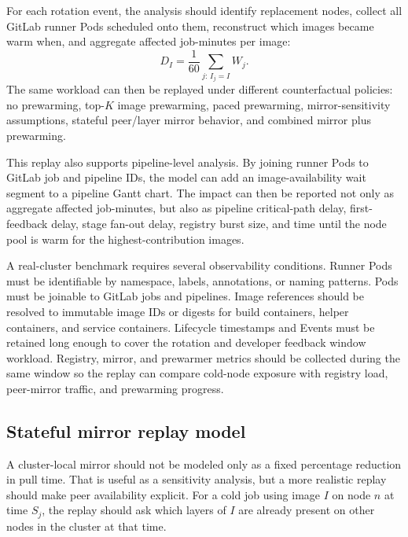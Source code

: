 \documentclass[11pt,a4paper]{article}
\begin{document}
For each rotation event, the analysis should identify replacement nodes, collect all GitLab runner Pods scheduled onto them, reconstruct which images became warm when, and aggregate affected job-minutes per image:
\begin{equation}
  D_I = \frac{1}{60}\sum_{j:\,I_j=I} W_j.
\end{equation}
The same workload can then be replayed under different counterfactual policies: no prewarming, top-\(K\) image prewarming, paced prewarming, mirror-sensitivity assumptions, stateful peer/layer mirror behavior, and combined mirror plus prewarming.

This replay also supports pipeline-level analysis. By joining runner Pods to GitLab job and pipeline IDs, the model can add an image-availability wait segment to a pipeline Gantt chart. The impact can then be reported not only as aggregate affected job-minutes, but also as pipeline critical-path delay, first-feedback delay, stage fan-out delay, registry burst size, and time until the node pool is warm for the highest-contribution images.

A real-cluster benchmark requires several observability conditions. Runner Pods must be identifiable by namespace, labels, annotations, or naming patterns. Pods must be joinable to GitLab jobs and pipelines. Image references should be resolved to immutable image IDs or digests for build containers, helper containers, and service containers. Lifecycle timestamps and Events must be retained long enough to cover the rotation and developer feedback window workload. Registry, mirror, and prewarmer metrics should be collected during the same window so the replay can compare cold-node exposure with registry load, peer-mirror traffic, and prewarming progress.

\subsection{Stateful mirror replay model}

A cluster-local mirror should not be modeled only as a fixed percentage reduction in pull time. That is useful as a sensitivity analysis, but a more realistic replay should make peer availability explicit. For a cold job using image \(I\) on node \(n\) at time \(S_j\), the replay should ask which layers of \(I\) are already present on other nodes in the cluster at that time.
\end{document}
